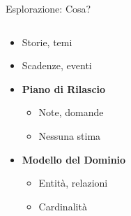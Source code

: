 \documentclass[compress, red, 14pt, pdf]{beamer}
\begin{document}
	\begin{frame}{Esplorazione: Cosa?}

		\begin{columns}[T]
		    \begin{column}{0.6\textwidth}

				\begin{itemize}
					\item Storie, temi
					\item Scadenze, eventi
				\end{itemize}

				\begin{itemize}
					\item \textbf{Piano di Rilascio}
					\begin{itemize}
						\item Note, domande
						\item Nessuna stima
					\end{itemize}
					\item \textbf{Modello del Dominio}
					\begin{itemize}
						\item Entità, relazioni
						\item Cardinalità
					\end{itemize}
				\end{itemize}
				

\end{column}
\end{columns}
\end{frame}
\end{document}
